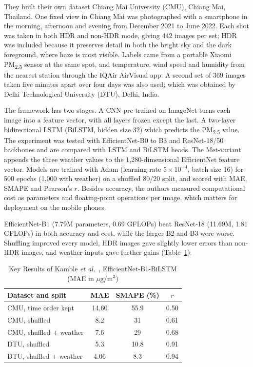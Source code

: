 \documentclass[conference]{IEEEtran}
\newcommand{\pmtwofive}{PM\textsubscript{2.5}}
\begin{document}
They built their own dataset Chiang Mai University (CMU), Chiang Mai, Thailand. One fixed view in Chiang Mai was photographed with a smartphone in the morning, afternoon and evening from December 2021 to June 2022. Each shot was taken in both HDR and non-HDR mode, giving 442 images per set; HDR was included because it preserves detail in both the bright sky and the dark foreground, where haze is most visible. Labels came from a portable Xiaomi \pmtwofive{} sensor at the same spot, and temperature, wind speed and humidity from the nearest station through the IQAir AirVisual app. A second set of 369 images taken five minutes apart over four days was also used; which was obtained by Delhi Technological University (DTU), Delhi, India.

The framework has two stages. A CNN pre-trained on ImageNet turns each image into a feature vector, with all layers frozen except the last. A two-layer bidirectional LSTM (BiLSTM, hidden size 32) which predicts the \pmtwofive{} value. The experiment was tested with EfficientNet-B0 to B3 and ResNet-18/50 backbones and are compared with LSTM and BiLSTM heads. The Met-variant appends the three weather values to the 1,280-dimensional EfficientNet feature vector. Models are trained with Adam (learning rate $5\times10^{-4}$, batch size 16) for 500 epochs (1,000 with weather) on a shuffled 80/20 split, and scored with MAE, SMAPE and Pearson's $r$. Besides accuracy, the authors measured computational cost as parameters and floating-point operations per image, which matters for deployment on the mobile phones.

EfficientNet-B1 (7.79M parameters, 0.69 GFLOPs) beat ResNet-18 (11.69M, 1.81 GFLOPs) in both accuracy and cost, while the larger B2 and B3 were worse. Shuffling improved every model, HDR images gave slightly lower errors than non-HDR images, and weather inputs gave further gains (Table~\ref{tab:kamble}).

\begin{table}[htbp]
\centering
\caption{Key Results of Kamble \textit{et al.}~\cite{kamble2025}, EfficientNet-B1-BiLSTM (MAE in $\mu$g/m$^3$)}
\label{tab:kamble}
\footnotesize
\begin{tabular}{lccc}
\toprule
Dataset and split & MAE & SMAPE (\%) & $r$ \\
\midrule
CMU, time order kept & 14.60 & 55.9 & 0.50 \\
CMU, shuffled & 8.2 & 31 & 0.61 \\
CMU, shuffled + weather & 7.6 & 29 & 0.68 \\
DTU, shuffled & 5.3 & 10.8 & 0.91 \\
DTU, shuffled + weather & 4.06 & 8.3 & 0.94 \\
\bottomrule
\end{tabular}
\end{table}
\end{document}
